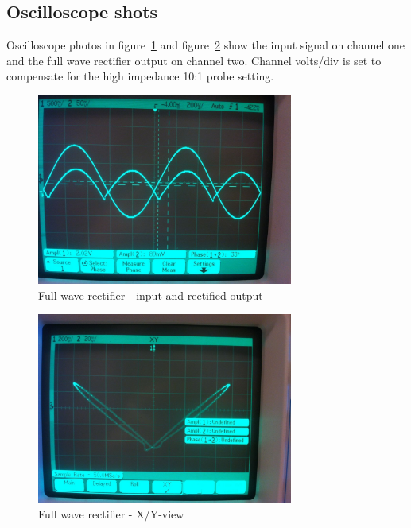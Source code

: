 \documentclass[11pt,a4paper]{article}
\begin{document}
\subsection{Oscilloscope shots}\label{fwr-oscilloscope-shots}
Oscilloscope photos in figure~\ref{fig:fwr1_scope} and
figure~\ref{fig:fwr2_scope} show the input signal on channel one and the full
wave rectifier output on channel two.  Channel volts/div is set to compensate
for the high impedance 10:1 probe setting. 

\begin{figure}[htbp]
    \centering
    \includegraphics[width=0.75\textwidth]{img/fwr1.jpg}
    \caption{Full wave rectifier - input and rectified output}
    \label{fig:fwr1_scope}
\end{figure}

\begin{figure}[htbp]
    \centering
    \includegraphics[width=0.75\textwidth]{img/fwr2.jpg}
    \caption{Full wave rectifier - X/Y-view}
    \label{fig:fwr2_scope}
\end{figure}
\end{document}
